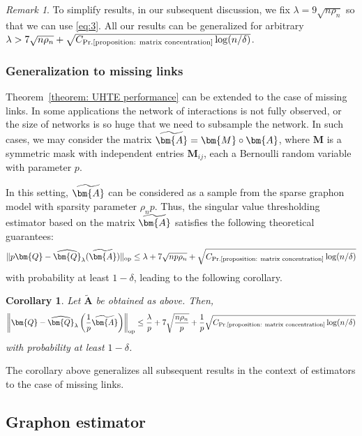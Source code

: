 \documentclass[11pt]{article}
\newcommand{\op}{\mathrm{op}}
\newcommand{\bA}{\bm{A}}
\newcommand{\bM}{\bm{M}}
\newcommand{\bQ}{\bm{Q}}
\newcommand{\bQhat}{\widehat{\bm{Q}}}
\newcommand{\constantBandeira}{C_{\text{Pr.\ref{proposition: matrix concentration}}}}
\newcommand{\<}{\langle}
\renewcommand{\>}{\rangle}
\theoremstyle{plain}
\newtheorem{corollary}{Corollary}
\theoremstyle{definition}
\theoremstyle{remark}
\newtheorem{remark}{Remark}
\begin{document}
\begin{remark} 
    To simplify results, in our subsequent discussion, we fix $\lambda = 9 \sqrt{n \rho_n}$ so that we can use \eqref{eq:3}. All our results  can be generalized for arbitrary $\lambda > 7 \sqrt{n \rho_n} + \sqrt{\constantBandeira \log (n/\delta)}$.
\end{remark} 



\subsubsection{Generalization to missing links}
Theorem~\ref{theorem: UHTE performance} can be extended to the case of missing links. In some applications the network of interactions is not fully observed, or the size of networks is so huge that we need to subsample the network. In such cases, we may consider the matrix $\widetilde \bA = \bM \circ \bA$, where $\bM$ is a symmetric mask with independent entries $\bM_{ij}$, each a Bernoulli random variable with parameter $p$.

In this setting, $\widetilde \bA$ can be considered as a sample from the sparse graphon model with sparsity parameter $\rho_n p$. Thus, the singular value thresholding estimator based on the matrix $\widetilde \bA$ satisfies the following theoretical guarantees:
\begin{align*}
	\Vert p \bQ - \bQhat_\lambda(\widetilde{\bA}) \Vert_{\op} \le \lambda + 7 \sqrt{n p \rho_n} + \sqrt{\constantBandeira \log (n/\delta)}
\end{align*}
with probability at least $1 - \delta$, leading to the following corollary.

\begin{corollary}
\label{corollary: missing links corrolary}
    Let $\widetilde{\bA}$ be obtained as above. Then,
    \begin{align*}
        \left \Vert \bQ - \bQhat_\lambda \left ( \frac{1}{p} \widetilde{\bA} \right ) \right  \Vert_{\op} \le \frac{\lambda}{p} + 7 \sqrt{\frac{n \rho_n}{p}} + \frac{1}{p} \sqrt{\constantBandeira \log (n/\delta)}
    \end{align*}
    with probability at least $1 - \delta$.
\end{corollary}

The corollary above generalizes all subsequent results in the context of estimators to the case of missing links.


\subsection{Graphon estimator}
\label{section: graphon estimation}
\end{document}
